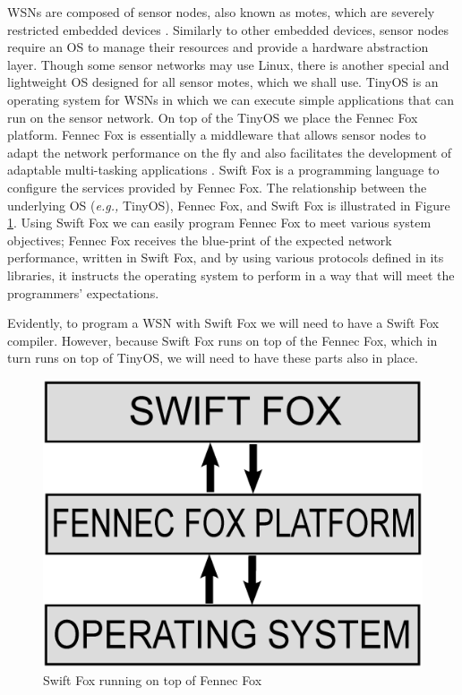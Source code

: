WSNs are composed of sensor nodes, also known as motes, which are
severely restricted embedded devices \cite{culler:2004}. Similarly to other
embedded devices, sensor nodes require an OS to manage their resources and 
provide a hardware abstraction layer. Though some sensor networks may use
Linux, there is another special and lightweight OS designed for all sensor
motes, which we shall use. TinyOS is an operating system for WSNs in which 
we can execute simple applications that can run on the sensor network. On
top of the TinyOS we place the Fennec Fox platform. Fennec Fox is
essentially a middleware that allows sensor nodes to adapt the network
performance on the fly and also facilitates the development of adaptable
multi-tasking applications \cite{marcin:whitepaper}. Swift Fox is 
a programming language to configure the services provided by Fennec Fox.
The relationship between the underlying OS (\textit{e.g.,} TinyOS), Fennec 
Fox, and Swift Fox is illustrated in Figure \ref{fig:sflayers}. Using
Swift Fox we can easily program Fennec Fox to meet various system
objectives; Fennec Fox receives the blue-print of the expected network
performance, written in Swift Fox, and by using various protocols defined
in its libraries, it instructs the operating system to perform in a way
that will meet the programmers' expectations.

Evidently, to program a WSN with Swift Fox we will need to have a Swift
Fox compiler. However, because Swift Fox runs on top of the Fennec Fox,
which in turn runs on top of TinyOS, we will need to have these parts also
in place.

\begin{figure}[htp]
\centering
	\includegraphics[scale=0.3]{fig/sflayers.eps}
	\caption{Swift Fox running on top of Fennec Fox}
	\label{fig:sflayers}
\end{figure}

